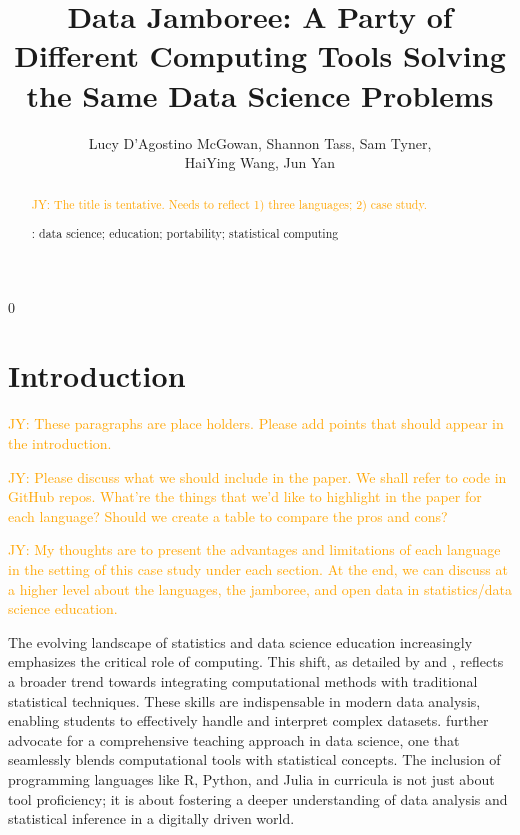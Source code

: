 \documentclass[12pt, letterpaper]{article}
\newcommand{\jy}[1]{\textcolor{orange}{JY: #1}}
\newcommand{\blind}{0}
\begin{document}

\title{\bf Data Jamboree: A Party of Different Computing Tools Solving the
  Same Data Science Problems}
\blind
{
  \author{Lucy D'Agostino McGowan,
    Shannon Tass,
    Sam Tyner,\\
    HaiYing Wang,
    Jun Yan
  }
} \fi

\maketitle

\doublespace

\begin{abstract}

  \jy{The title is tentative. Needs to reflect 1) three languages; 2) case study.}


\bigskip
{}:
data science;
education;
portability;
statistical computing
\end{abstract}


\section{Introduction}
\label{sec:intro}


\jy{These paragraphs are place holders. Please add points that should appear in
  the introduction.}

\jy{Please discuss what we should include in the paper. We shall refer to code
  in GitHub repos. What're the things that we'd like to highlight in the paper
  for each language? Should we create a table to compare the pros and cons?}

\jy{My thoughts are to present the advantages and limitations of each language
  in the setting of this case study under each section. At the end, we can
  discuss at a higher level about the languages, the jamboree, and open data in
  statistics/data science education.}


The evolving landscape of statistics and data science education increasingly
emphasizes the critical role of computing. This shift, as detailed by
\citet{hardin2021computing} and \citet{nolan2010computing}, reflects a broader
trend towards integrating computational methods with traditional statistical
techniques. These skills are indispensable in modern data analysis, enabling
students to effectively handle and interpret complex
datasets. \citet{hicks2018guide} further advocate for a comprehensive teaching
approach in data science, one that seamlessly blends computational tools with
statistical concepts. The inclusion of programming languages like R, Python, and
Julia in curricula is not just about tool proficiency; it is about fostering a
deeper understanding of data analysis and statistical inference in a digitally
driven world.
\end{document}
